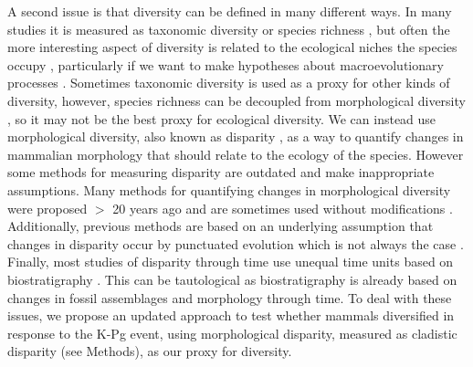 \documentclass[12pt,letterpaper]{article}
\begin{document}
A second issue is that diversity can be defined in many different ways.
In many studies it is measured as taxonomic diversity or species richness \citep{Stadler12042011,meredithimpacts2011,O'Leary08022013}, but often the more interesting aspect of diversity is related to the ecological niches the species occupy \citep{Wesley-Hunt2005,Brusatte12092008,toljagictriassic-jurassic2013}, particularly if we want to make hypotheses about macroevolutionary processes \citep{Pearman2008149,OlsonRadiation,Losos2010,glor2010phylogenetic,benton2015}.
Sometimes taxonomic diversity is used as a proxy for other kinds of diversity, however, species richness can be decoupled from morphological diversity \citep[e.g.][]{slaterCetacean,ruta2013,hopkinsdecoupling2013}, so it may not be the best proxy for ecological diversity.
We can instead use morphological diversity, also known as disparity \citep[e.g.][]{Wills1994,Erwin2007,Hughes20082013}, as a way to quantify changes in mammalian morphology that should relate to the ecology of the species.
However some methods for measuring disparity are outdated and make inappropriate assumptions.
Many methods for quantifying changes in morphological diversity were proposed $>$ 20 years ago \citep{Foote01071994,Wills1994} and are sometimes used without modifications \citep[e.g.,][]{brusatte50,Brusatte12092008,cisneros2010,thorneresetting2011,prentice2011,brusattedinosaur2012,toljagictriassic-jurassic2013,ruta2013,bentonmodels2014,bensonfaunal2014}. %
Additionally, previous methods are based on an underlying assumption that changes in disparity occur by punctuated evolution \citep[e.g.][]{Wesley-Hunt2005} which is not always the case \citep{Hunt21042015}.
Finally, most studies of disparity through time use unequal time units based on biostratigraphy \citep{Brusatte12092008,brusattedinosaur2012,toljagictriassic-jurassic2013}. 
This can be tautological as biostratigraphy is already based on changes in fossil assemblages and morphology through time.
To deal with these issues, we propose an updated approach to test whether mammals diversified in response to the K-Pg event, using morphological disparity, measured as cladistic disparity (see Methods), as our proxy for diversity.
\end{document}
